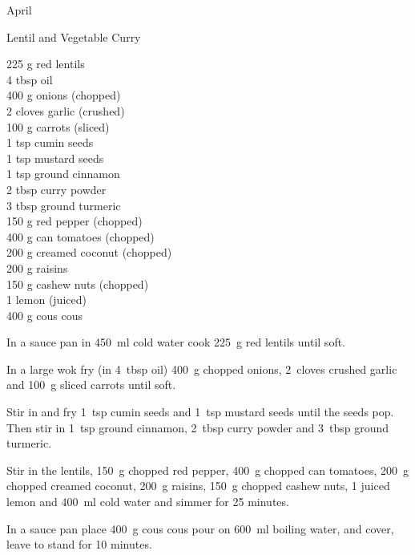 \begin{menu}{April}
    \begin{recipe}{2}{Lentil and Vegetable Curry}%
		\begin{ingredients}
		225 g red lentils  \\
	4 tbsp oil  \\
	400 g onions (chopped) \\
	2 cloves garlic (crushed) \\
	100 g carrots (sliced) \\
	1 tsp cumin seeds  \\
	1 tsp mustard seeds  \\
	1 tsp ground cinnamon  \\
	2 tbsp curry powder  \\
	3 tbsp ground turmeric  \\
	150 g red pepper (chopped) \\
	400 g can tomatoes (chopped) \\
	200 g creamed coconut (chopped) \\
	200 g raisins  \\
	150 g cashew nuts (chopped) \\
	1  lemon (juiced) \\
	400 g cous cous  \\
	
		\end{ingredients}
	
	
	
    \begin{instructions}
    \item 
        In a sauce pan in
        450~ml  cold water
        cook
        225~g  red lentils
        until soft.
      \item 
        In a large wok fry
        (in 4~tbsp  oil)
        400~g chopped onions,
        2~cloves crushed garlic
        and
        100~g sliced carrots
        until soft.
      \item 
        Stir in and fry
        1~tsp  cumin seeds
        and
        1~tsp  mustard seeds
        until the seeds pop.
        Then stir in
        1~tsp  ground cinnamon,
        2~tbsp  curry powder
        and
        3~tbsp  ground turmeric.
      \item 
        Stir in
        the lentils,
        150~g chopped red pepper,
        400~g chopped can tomatoes,
        200~g chopped creamed coconut,
        200~g  raisins,
        150~g chopped cashew nuts,
        1 juiced lemon
        and
        400~ml  cold water
        and simmer for 25 minutes.
      \item 
    In a
    sauce pan 
    place
    400~g  cous cous
    pour on
    600~ml  boiling water,
    and cover, leave to stand for 10 minutes.
  

\end{instructions}
\end{recipe}
\end{menu}
